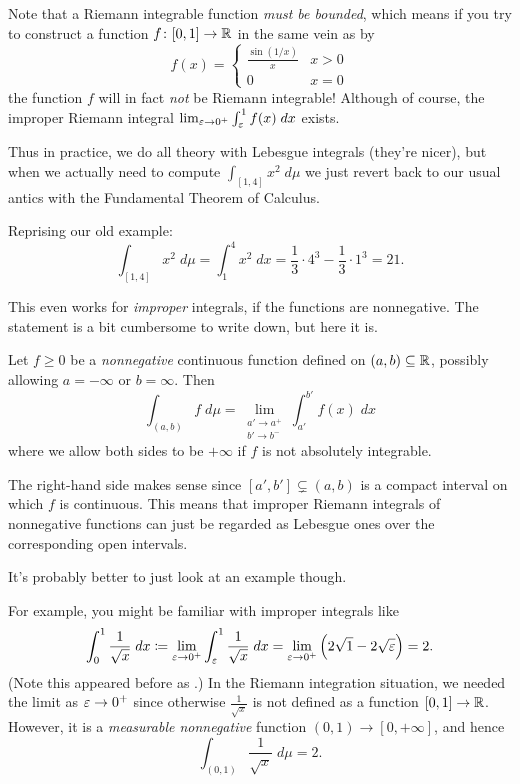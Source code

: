 Note that a Riemann integrable function \emph{must be bounded},
which means if you try to construct a function $f \colon [0, 1] \to \mathbb R$
in the same vein as  by
\[
	f(x) = \begin{cases}
		\frac{\sin(1/x)}{x} & x > 0 \\
		0 & x = 0
	\end{cases}
\]
the function $f$ will in fact \emph{not} be Riemann integrable!
Although of course, the improper Riemann integral $\lim_{\varepsilon \to 0^+} \int_\varepsilon^1 f(x) \; dx$ exists.

Thus in practice, we do all theory with Lebesgue integrals (they're nicer),
but when we actually need to compute $\int_{[1,4]} x^2 \; d\mu$
we just revert back to our usual antics with the
Fundamental Theorem of Calculus.
\begin{example}
	Reprising our old example:
	\[ \int_{[1,4]} x^2 \; d\mu
		= \int_1^4 x^2 \; dx
		= \frac13 \cdot 4^3 - \frac13 \cdot 1^3 = 21.  \]
\end{example}

This even works for \emph{improper} integrals,
if the functions are nonnegative.
The statement is a bit cumbersome to write down, but here it is.
\begin{theorem}
	Let $f \ge 0$ be a \emph{nonnegative}
	continuous function defined on $(a,b) \subseteq \mathbb R$,
	possibly allowing $a = -\infty$ or $b = \infty$.
	Then
	\[ \int_{(a,b)} f \; d\mu
		= \lim_{\substack{a' \to a^+ \\ b' \to b^-}}
		\int_{a'}^{b'} f(x) \; dx \]
	where we allow both sides to be $+\infty$
	if $f$ is not absolutely integrable.
\end{theorem}
The right-hand side makes sense since $[a',b'] \subsetneq (a,b)$
is a compact interval on which $f$ is continuous.
This means that improper Riemann integrals of nonnegative
functions can just be regarded as Lebesgue ones
over the corresponding open intervals.

It's probably better to just look at an example though.
\begin{example}
	For example, you might be familiar with improper integrals like
	\[ \int_0^1 \frac{1}{\sqrt x} \; dx
		\coloneqq \lim_{\varepsilon \to 0^+}
		\int_\varepsilon^1 \frac{1}{\sqrt x} \; dx
		= \lim_{\varepsilon \to 0^+} \left( 2\sqrt{1} - 2\sqrt{\varepsilon} \right) = 2.
	\]
	(Note this appeared before as .)
	In the Riemann integration situation, we needed the limit as $\varepsilon \to 0^+$
	since otherwise $\frac{1}{\sqrt x}$ is not defined as a function $[0,1] \to \mathbb R$.
	However, it is a \emph{measurable nonnegative}
	function $(0,1) \to [0,+\infty]$, and hence
	\[ \int_{(0,1)} \frac{1}{\sqrt x} \; d\mu = 2. \]
\end{example}

